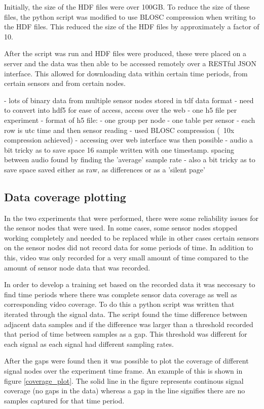Initially, the size of the HDF files were over 100GB. To reduce the size of these files, the python script was modified to use BLOSC compression when writing to the HDF files. This reduced the size of the HDF files by approximately a factor of 10. 

After the script was run and HDF files were produced, these were placed on a server and the data was then able to be accessed remotely over a RESTful JSON interface. This allowed for downloading data within certain time periods, from certain sensors and from certain nodes. 

- lots of binary data from multiple sensor nodes stored in tdf data format
- need to convert into hdf5 for ease of access, access over the web
	- one h5 file per experiment
	- format of h5 file:
		- one group per node	
		- one table per sensor	
		- each row is utc time and then sensor reading
- used BLOSC compression (~10x compression achieved)
- accessing over web interface was then possible 
- audio a bit tricky as to save space 16 sample written with one timestamp. spacing between audio found by finding the 'average' sample rate 
	- also a bit tricky as to save space saved either as raw, as differences or as a 'silent page'

\subsection{Data coverage plotting}

In the two experiments that were performed, there were some reliability issues for the sensor nodes that were used. In some cases, some sensor nodes stopped working completely and needed to be replaced while in other cases certain sensors on the sensor nodes did not record data for some periods of time. In addition to this, video was only recorded for a very small amount of time compared to the amount of sensor node data that was recorded. 

In order to develop a training set based on the recorded data it was neccesary to find time periods where there was complete sensor data coverage as well as corresponding video coverage. To do this a python script was written that iterated through the signal data. The script found the time difference between adjacent data samples and if the difference was larger than a threshold recorded that period of time between samples as a gap. This threshold was different for each signal as each signal had different sampling rates. 

After the gaps were found then it was possible to plot the coverage of different signal nodes over the experiment time frame. An example of this is shown in figure \ref{coverage_plot}. The solid line in the figure represents continous signal coverage (no gaps in the data) whereas a gap in the line signifies there are no samples captured for that time period. 

